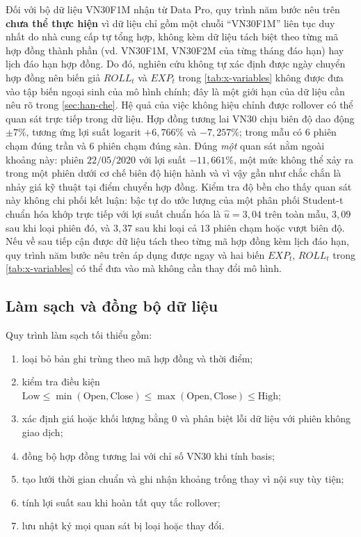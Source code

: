 \documentclass[12pt,a4paper]{article}
\numberwithin{equation}{section}
\begin{document}
Đối với bộ dữ liệu VN30F1M nhận từ Data Pro, quy trình năm bước nêu trên \textbf{chưa thể thực hiện} vì dữ liệu chỉ gồm một chuỗi ``VN30F1M'' liên tục duy nhất do nhà cung cấp tự tổng hợp, không kèm dữ liệu tách biệt theo từng mã hợp đồng thành phần (vd. VN30F1M, VN30F2M của từng tháng đáo hạn) hay lịch đáo hạn hợp đồng. Do đó, nghiên cứu không tự xác định được ngày chuyển hợp đồng nên biến giả $ROLL_t$ và $EXP_t$ trong \cref{tab:x-variables} không được đưa vào tập biến ngoại sinh của mô hình chính; đây là một giới hạn của dữ liệu cần nêu rõ trong \cref{sec:han-che}. Hệ quả của việc không hiệu chỉnh được rollover có thể quan sát trực tiếp trong dữ liệu. Hợp đồng tương lai VN30 chịu biên độ dao động $\pm7\%$, tương ứng lợi suất logarit $+6{,}766\%$ và $-7{,}257\%$; trong mẫu có $6$ phiên chạm đúng trần và $6$ phiên chạm đúng sàn. Đúng \emph{một} quan sát nằm ngoài khoảng này: phiên $22/05/2020$ với lợi suất $-11{,}661\%$, một mức không thể xảy ra trong một phiên dưới cơ chế biên độ hiện hành và vì vậy gần như chắc chắn là nhảy giá kỹ thuật tại điểm chuyển hợp đồng. Kiểm tra độ bền cho thấy quan sát này không chi phối kết luận: bậc tự do ước lượng của một phân phối Student-t chuẩn hóa khớp trực tiếp với lợi suất chuẩn hóa là $\hat
u = 3{,}04$ trên toàn mẫu, $3{,}09$ sau khi loại phiên đó, và $3{,}37$ sau khi loại cả $13$ phiên chạm hoặc vượt biên độ. Nếu về sau tiếp cận được dữ liệu tách theo từng mã hợp đồng kèm lịch đáo hạn, quy trình năm bước nêu trên áp dụng được ngay và hai biến $EXP_t$, $ROLL_t$ trong \cref{tab:x-variables} có thể đưa vào mà không cần thay đổi mô hình.

\subsection{Làm sạch và đồng bộ dữ liệu}\label{subsec:data-cleaning}

Quy trình làm sạch tối thiểu gồm:
\begin{enumerate}
  \item loại bỏ bản ghi trùng theo mã hợp đồng và thời điểm;
  \item kiểm tra điều kiện $\text{Low}\le\min(\text{Open},\text{Close})\le\max(\text{Open},\text{Close})\le\text{High}$;
  \item xác định giá hoặc khối lượng bằng $0$ và phân biệt lỗi dữ liệu với phiên không giao dịch;
  \item đồng bộ hợp đồng tương lai với chỉ số VN30 khi tính basis;
  \item tạo lưới thời gian chuẩn và ghi nhận khoảng trống thay vì nội suy tùy tiện;
  \item tính lợi suất sau khi hoàn tất quy tắc rollover;
  \item lưu nhật ký mọi quan sát bị loại hoặc thay đổi.
\end{enumerate}
\end{document}
